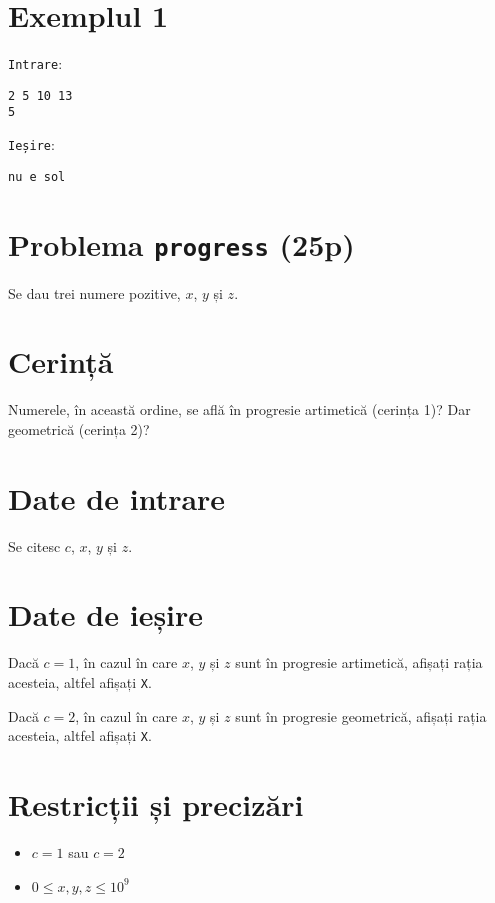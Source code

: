 \documentclass{scrartcl}
\begin{document}
{
\parindent0pt
    
\section*{Exemplul 1}
\texttt{Intrare}:
    \begin{lstlisting}
2 5 10 13
5
    \end{lstlisting}

\texttt{Ieșire}:
    \begin{lstlisting}
nu e sol
    \end{lstlisting}
}

\pagebreak

\section*{Problema \texttt{progress} (25p)}
Se dau trei numere pozitive, $x$, $y$ și $z$.
\section*{Cerință}
Numerele, în această ordine, se află în progresie artimetică (cerința 1)? Dar geometrică (cerința 2)?
\section*{Date de intrare}
Se citesc $c$, $x$, $y$ și $z$.
\section*{Date de ieșire}
Dacă $c = 1$, în cazul în care $x$, $y$ și $z$ sunt în progresie artimetică, afișați rația acesteia, altfel afișați \texttt{X}.

\noindent Dacă $c = 2$, în cazul în care $x$, $y$ și $z$ sunt în progresie geometrică, afișați rația acesteia, altfel afișați \texttt{X}.
\section*{Restricții și precizări}
\begin{itemize}
    \item $c = 1$ sau $c = 2$
    \item $0 \leq x,y,z \leq 10^9$
\end{itemize}
\end{document}
